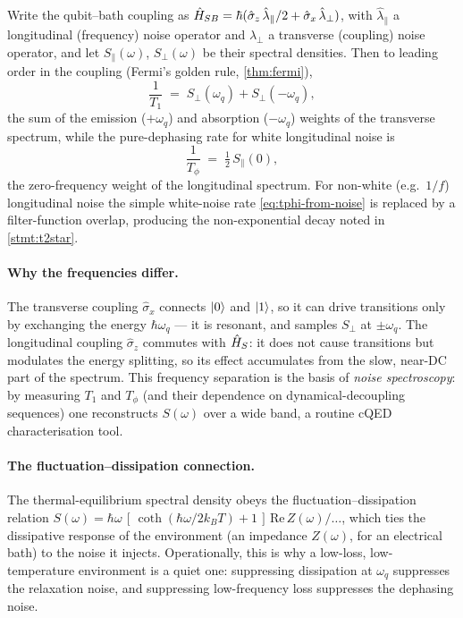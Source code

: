 \begin{statement}
\label{stmt:noise-rates}
Write the qubit--bath coupling as
$\hat{H}_{SB}=\hbar(\hat\sigma_z\,\hat\lambda_\parallel/2 + \hat\sigma_x\,\hat\lambda_\perp)$,
with $\hat\lambda_\parallel$ a longitudinal (frequency) noise
operator and $\hat\lambda_\perp$ a transverse (coupling) noise
operator, and let $S_\parallel(\omega)$, $S_\perp(\omega)$ be their
spectral densities. Then to leading order in the coupling
(Fermi's golden rule, \cref{thm:fermi}),
\begin{equation}
\label{eq:t1-from-noise}
\frac{1}{T_1} \;=\; S_\perp(\omega_q) + S_\perp(-\omega_q),
\end{equation}
the sum of the emission ($+\omega_q$) and absorption ($-\omega_q$)
weights of the transverse spectrum, while the pure-dephasing rate
for white longitudinal noise is
\begin{equation}
\label{eq:tphi-from-noise}
\frac{1}{T_\phi} \;=\; \tfrac12\,S_\parallel(0),
\end{equation}
the zero-frequency weight of the longitudinal spectrum. For
non-white (e.g.\ $1/f$) longitudinal noise the simple
white-noise rate \cref{eq:tphi-from-noise} is replaced by a
filter-function overlap, producing the non-exponential decay noted
in \cref{stmt:t2star}.
\end{statement}

\paragraph{Why the frequencies differ.}
The transverse coupling $\hat\sigma_x$ connects $\ket0$ and $\ket1$,
so it can drive transitions only by exchanging the energy
$\hbar\omega_q$ --- it is resonant, and samples $S_\perp$ at
$\pm\omega_q$. The longitudinal coupling $\hat\sigma_z$ commutes
with $\hat{H}_S$: it does not cause transitions but modulates the
energy splitting, so its effect accumulates from the slow, near-DC
part of the spectrum. This frequency separation is the basis of
\emph{noise spectroscopy}: by measuring $T_1$ and $T_\phi$ (and
their dependence on dynamical-decoupling sequences) one reconstructs
$S(\omega)$ over a wide band, a routine cQED characterisation tool.

\paragraph{The fluctuation--dissipation connection.}
The thermal-equilibrium spectral density obeys the
fluctuation--dissipation relation
$S(\omega)=\hbar\omega\,[\,\coth(\hbar\omega/2k_BT)+1\,]\,\mathrm{Re}\,Z(\omega)/\ldots$,
which ties the dissipative response of the environment (an
impedance $Z(\omega)$, for an electrical bath) to the noise it
injects. Operationally, this is why a low-loss, low-temperature
environment is a quiet one: suppressing dissipation at $\omega_q$
suppresses the relaxation noise, and suppressing low-frequency loss
suppresses the dephasing noise.

